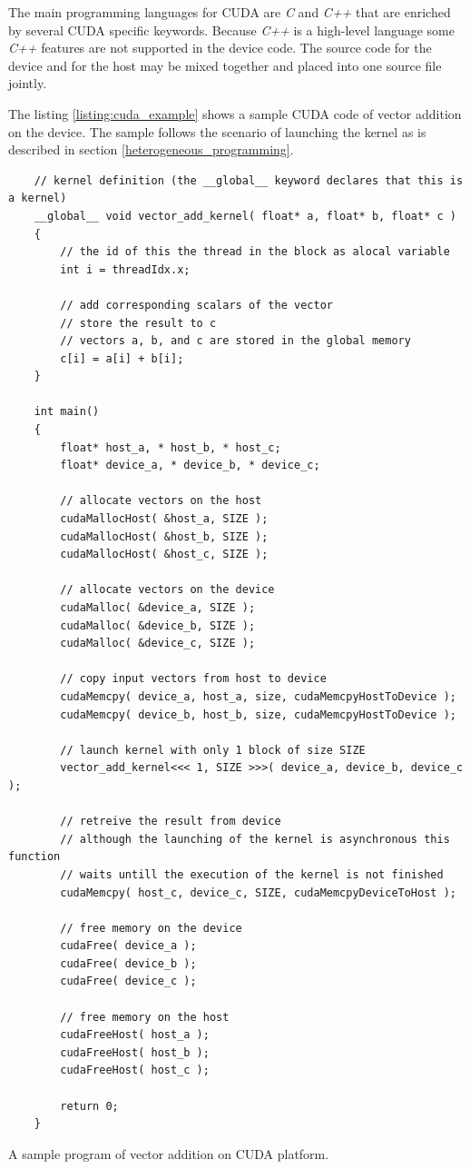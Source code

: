 \documentclass[12pt,oneside]{fithesis2}
\begin{document}
The main programming languages for CUDA are \emph{C} and \emph{C++} that are enriched by several CUDA specific keywords. Because \emph{C++} is a high-level language some \emph{C++} features are not supported in the device code. The source code for the device and for the host may be mixed together and placed into one source file jointly.


The listing \ref{listing:cuda_example} shows a sample CUDA code of vector addition on the device. The sample follows the scenario of launching the kernel as is described in section \ref{heterogeneous_programming}. 

\begin{listing}[H]
	\begin{verbatim}
	// kernel definition (the __global__ keyword declares that this is a kernel)
	__global__ void vector_add_kernel( float* a, float* b, float* c )
	{
		// the id of this the thread in the block as alocal variable
		int i = threadIdx.x;
		
		// add corresponding scalars of the vector
		// store the result to c
		// vectors a, b, and c are stored in the global memory
		c[i] = a[i] + b[i];
	}
	
	int main()
	{
		float* host_a, * host_b, * host_c;
		float* device_a, * device_b, * device_c;
	
		// allocate vectors on the host
		cudaMallocHost( &host_a, SIZE );
		cudaMallocHost( &host_b, SIZE );
		cudaMallocHost( &host_c, SIZE );
		
		// allocate vectors on the device
		cudaMalloc( &device_a, SIZE );
		cudaMalloc( &device_b, SIZE );
		cudaMalloc( &device_c, SIZE );
		
		// copy input vectors from host to device
		cudaMemcpy( device_a, host_a, size, cudaMemcpyHostToDevice );
		cudaMemcpy( device_b, host_b, size, cudaMemcpyHostToDevice );
		
		// launch kernel with only 1 block of size SIZE
		vector_add_kernel<<< 1, SIZE >>>( device_a, device_b, device_c );
		
		// retreive the result from device
		// although the launching of the kernel is asynchronous this function 
		// waits untill the execution of the kernel is not finished
		cudaMemcpy( host_c, device_c, SIZE, cudaMemcpyDeviceToHost );
		
		// free memory on the device
		cudaFree( device_a );
		cudaFree( device_b );
		cudaFree( device_c );
		
		// free memory on the host
		cudaFreeHost( host_a );
		cudaFreeHost( host_b );
		cudaFreeHost( host_c );
		
		return 0;
	}
	\end{verbatim}
	\caption{A sample program of vector addition on CUDA platform.}
	\label{listing:cuda_example}
\end{listing}
\end{document}
